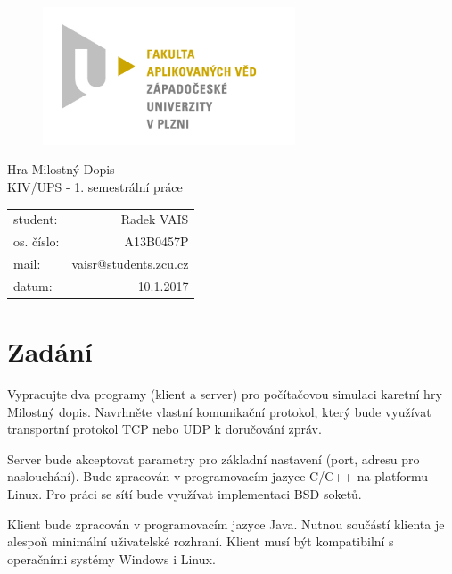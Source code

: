 \documentclass[12pt, a4paper]{article}
\begin{document}
\begin{figure}[h!]
\centering
\includegraphics[bb= 0 0 820 445 , width=75mm]{favlogo.jpg}
\end{figure}

\vspace{5cm}

{\centering
{\huge Hra Milostný Dopis}\\[1em]
{\large KIV/UPS - 1. semestrální práce}\\[7,5cm]
}

\begin{tabular}{l r}
student: & Radek VAIS\\
os. číslo: & A13B0457P\\
mail: & vaisr@students.zcu.cz\\
datum: & 10.1.2017\\
\end{tabular}

\thispagestyle{empty}
\newpage

\section{Zadání} %

Vypracujte dva programy (klient a server) pro počítačovou simulaci karetní hry Milostný dopis. Navrhněte vlastní komunikační protokol, který bude využívat transportní protokol TCP nebo UDP k doručování zpráv.

Server bude akceptovat parametry pro základní nastavení (port, adresu pro naslouchání). Bude zpracován v programovacím jazyce C/C++ na platformu Linux. Pro práci se sítí bude využívat implementaci BSD soketů.

Klient bude zpracován v programovacím jazyce Java. Nutnou součástí klienta je alespoň minimální uživatelské rozhraní. Klient musí být kompatibilní s operačními systémy Windows i Linux.  
\end{document}
